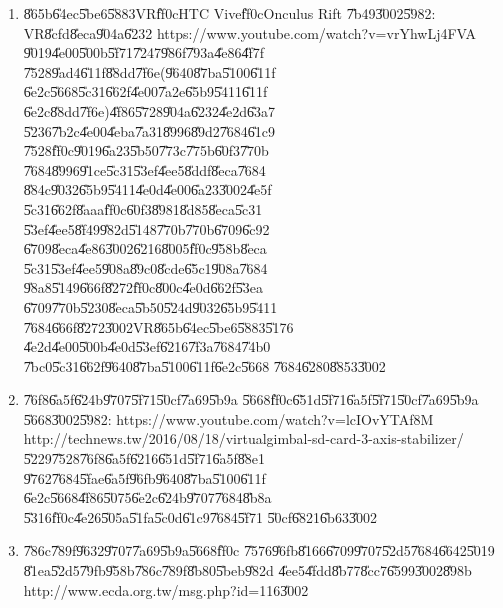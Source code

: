 \documentclass[12pt,a4paper]{article}
\begin{document}
\begin{enumerate}
\item \U{865b}\U{64ec}\U{5be6}\U{5883}VR\U{ff0c}HTC Vive\U{ff0c}Onculus Rift%
\U{7b49}\U{3002}\U{5982}: VR\U{8cfd}\U{8eca}\U{904a}\U{6232}\newline
https://www.youtube.com/watch?v=vrYhwLj4FVA\newline
\U{9019}\U{4e00}\U{500b}\U{5f71}\U{7247}\U{986f}\U{793a}\U{4e86}\U{4f7f}%
\U{7528}\U{9ad4}\U{611f}\U{88dd}\U{7f6e}(\U{9640}\U{87ba}\U{5100}\U{611f}%
\U{6e2c}\U{5668}\U{5c31}\U{662f}\U{4e00}\U{7a2e}\U{65b9}\U{5411}\U{611f}%
\U{6e2c}\U{88dd}\U{7f6e})\U{4f86}\U{5728}\U{904a}\U{6232}\U{4e2d}\U{63a7}%
\U{5236}\U{7b2c}\U{4e00}\U{4eba}\U{7a31}\U{8996}\U{89d2}\U{7684}\U{61c9}%
\U{7528}\U{ff0c}\U{9019}\U{6a23}\U{5b50}\U{773c}\U{775b}\U{60f3}\U{770b}%
\U{7684}\U{8996}\U{91ce}\U{5c31}\U{53ef}\U{4ee5}\U{8ddf}\U{8eca}\U{7684}%
\U{884c}\U{9032}\U{65b9}\U{5411}\U{4e0d}\U{4e00}\U{6a23}\U{3002}\U{4e5f}%
\U{5c31}\U{662f}\U{8aaa}\U{ff0c}\U{60f3}\U{8981}\U{8d85}\U{8eca}\U{5c31}%
\U{53ef}\U{4ee5}\U{8f49}\U{982d}\U{5148}\U{770b}\U{770b}\U{6709}\U{6c92}%
\U{6709}\U{8eca}\U{4e86}\U{3002}\U{6216}\U{8005}\U{ff0c}\U{958b}\U{8eca}%
\U{5c31}\U{53ef}\U{4ee5}\U{908a}\U{89c0}\U{8cde}\U{65c1}\U{908a}\U{7684}%
\U{98a8}\U{5149}\U{666f}\U{8272}\U{ff0c}\U{800c}\U{4e0d}\U{662f}\U{53ea}%
\U{6709}\U{770b}\U{5230}\U{8eca}\U{5b50}\U{524d}\U{9032}\U{65b9}\U{5411}%
\U{7684}\U{666f}\U{8272}\U{3002}VR\U{865b}\U{64ec}\U{5be6}\U{5883}\U{5176}%
\U{4e2d}\U{4e00}\U{500b}\U{4e0d}\U{53ef}\U{6216}\U{7f3a}\U{7684}\U{74b0}%
\U{7bc0}\U{5c31}\U{662f}\U{9640}\U{87ba}\U{5100}\U{611f}\U{6e2c}\U{5668}%
\U{7684}\U{6280}\U{8853}\U{3002}

\item \U{76f8}\U{6a5f}\U{624b}\U{9707}\U{5f71}\U{50cf}\U{7a69}\U{5b9a}%
\U{5668}\U{ff0c}\U{651d}\U{5f71}\U{6a5f}\U{5f71}\U{50cf}\U{7a69}\U{5b9a}%
\U{5668}\U{3002}\U{5982}:\newline
https://www.youtube.com/watch?v=lcIOvYTAf8M\newline
http://technews.tw/2016/08/18/virtualgimbal-sd-card-3-axis-stabilizer/%
\newline
\U{5229}\U{7528}\U{76f8}\U{6a5f}\U{6216}\U{651d}\U{5f71}\U{6a5f}\U{88e1}%
\U{9762}\U{7684}\U{5fae}\U{6a5f}\U{96fb}\U{9640}\U{87ba}\U{5100}\U{611f}%
\U{6e2c}\U{5668}\U{4f86}\U{5075}\U{6e2c}\U{624b}\U{9707}\U{7684}\U{8b8a}%
\U{5316}\U{ff0c}\U{4e26}\U{505a}\U{51fa}\U{5c0d}\U{61c9}\U{7684}\U{5f71}%
\U{50cf}\U{6821}\U{6b63}\U{3002}

\item \U{786c}\U{789f}\U{9632}\U{9707}\U{7a69}\U{5b9a}\U{5668}\U{ff0c}%
\U{7576}\U{96fb}\U{8166}\U{6709}\U{9707}\U{52d5}\U{7684}\U{6642}\U{5019}%
\U{81ea}\U{52d5}\U{79fb}\U{958b}\U{786c}\U{789f}\U{8b80}\U{5beb}\U{982d}%
\U{4ee5}\U{4fdd}\U{8b77}\U{8cc7}\U{6599}\U{3002}\U{898b}\newline
http://www.ecda.org.tw/msg.php?id=116\U{3002}


\end{enumerate}
\end{document}
